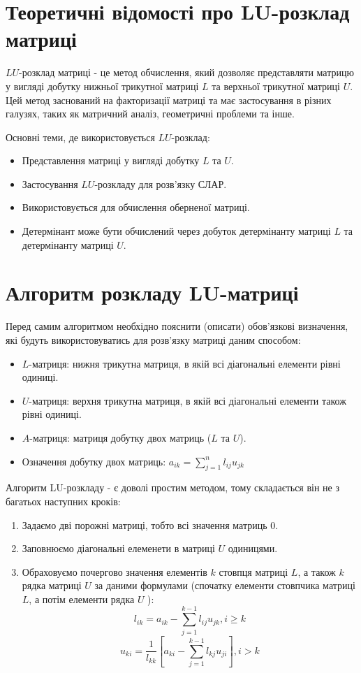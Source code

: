 \documentclass[12pt,a4paper]{article}
\begin{document}
 \newpage
 \section{Теоретичні відомості про LU-розклад матриці}
 \hspace{1 cm} \(LU\)-розклад матриці - це метод обчислення, який дозволяє представляти матрицю у вигляді добутку нижньої трикутної матриці \(L\) та верхньої трикутної матриці \(U\). Цей метод заснований на факторизації матриці та має застосування в різних галузях, таких як матричний аналіз, геометричні проблеми та інше.

 Основні теми, де використовується \(LU\)-розклад:
 \begin{itemize}
    \item Представлення матриці у вигляді добутку \(L\) та \(U\).
    \item Застосування \(LU\)-розкладу для розв'язку СЛАР.
    \item Використовується для обчислення оберненої матриці.
    \item Детермінант може бути обчислений через добуток детермінанту матриці \(L\) та детермінанту матриці \(U\).
 \end{itemize}

 \section*{Алгоритм розкладу LU-матриці}
 \hspace{1 cm} Перед самим алгоритмом необхідно пояснити (описати) обов'язкові визначення, які будуть використовуватись для розв'язку матриці даним способом:
 \begin{itemize}
    \item \(L\)-матриця: нижня трикутна матриця, в якій всі діагональні елементи рівні одиниці.
    \item \(U\)-матриця: верхня трикутна матриця, в якій всі діагональні елементи також рівні одиниці.
    \item \(A\)-матриця: матриця добутку двох матриць (\(L\) та \(U\)).
    \item Означення добутку двох матриць: \(a_{ik} = \sum_{j=1}^{n} l_{ij} u_{jk}\)
 \end{itemize}

 \hspace{1 cm} Алгоритм LU-розкладу - є доволі простим методом, тому складається він не з багатьох наступних кроків:
 \begin{enumerate}
    \item Задаємо дві порожні матриці, тобто всі значення матриць 0.
    \item Заповнюємо діагональні елеменети в матриці \(U\) одиницями.
    \item Обраховуємо почергово значення елементів \(k\) стовпця матриці \(L\), а також \(k\) рядка матриці \(U\) за даними формулами (спочатку елементи стовпчика матриці \(L\), а потім елементи рядка \(U\) ):
    \[ l_{ik} = a_{ik} - \sum_{j=1}^{k-1} l_{ij} u_{jk}, i \geq k\]
    \[ u_{ki} = \frac{1}{l_{kk}} [a_{ki} - \sum_{j=1}^{k-1} l_{kj} u_{ji}], i > k \]
 \end{enumerate}
\end{document}
